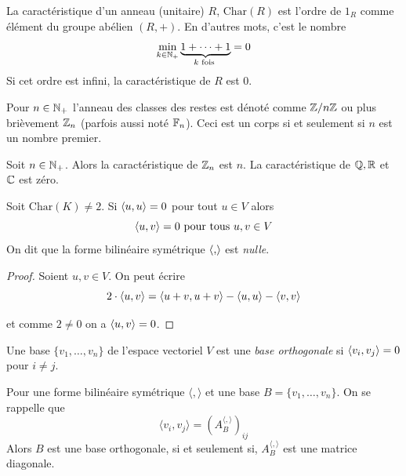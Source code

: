 \begin{definition}
  \label{def:8}
  La caractéristique d'un anneau (unitaire) $R$, $\mathrm{Char}(R)$ 
  est l'ordre de $1_R$
  comme élément du groupe abélien $(R,+)$.
  En d'autres mots, c'est le nombre 
  \begin{displaymath}
    \min_{k \in \mathbb{N}_+} \underbrace{1+ \cdots + 1}_{k \text{ fois }} = 0
  \end{displaymath}
  Si cet ordre est infini, la caractéristique de $R$ est $0$.
\end{definition}

\begin{notation}
  Pour $n \in \mathbb{N}_+$ l'anneau des classes des restes est dénoté comme
  $\mathbb{Z} / n \mathbb{Z}$ ou plus brièvement $\mathbb{Z}_n$ (parfois aussi noté $\Bbb F_n$). Ceci est un corps si et seulement si $n$ est un nombre premier. 
\end{notation}

\begin{example}
\label{exe:10}
   Soit $n \in \mathbb{N}_+$. Alors la  caractéristique de $\mathbb{Z}_n$ est $n$. 
   La caractéristique de $\mathbb{Q},\mathbb{R}$ et $\mathbb{C}$ est zéro.    
\end{example}

\begin{lemma}
  \label{lem:1}
 Soit $\mathrm{Char}(K)\neq 2$. Si $\langle {u,u} \rangle=0$ pour tout $u \in V$ alors 
  \begin{displaymath}
    \langle {u,v} \rangle=0 \text{ pour tous }u,v \in V
  \end{displaymath}
On dit que la forme bilinéaire symétrique $\langle {,} \rangle$ est  \emph{nulle}. 
\end{lemma}

\begin{proof}
  Soient $u,v \in V$. 
  On peut écrire
  \begin{displaymath}
   2 \cdot  \langle {u,v} \rangle = \langle {u+v,u+v} \rangle - \langle {u,u} \rangle - \langle {v,v} \rangle 
  \end{displaymath}

et comme $2 \neq 0$ on a $\langle {u,v} \rangle = 0$. 
\end{proof}


\begin{definition}
  \label{def:38}
  Une base $\{v_1,\dots,v_n\}$
  de l'espace vectoriel $V$
  est une \emph{base orthogonale} si $\langle {v_i,v_j} \rangle=0$
  pour $i\neq j$.
\end{definition}



\begin{remark}
  \label{rem:7}
  Pour une forme bilinéaire symétrique $\langle , \rangle$ et une base $B = \{v_1,\dots,v_n\}$. On se rappelle que 
  \begin{displaymath}
    〈v_i,v_j〉 = (A_B^{〈, 〉})_{ij}
  \end{displaymath}
  Alors $B$ est une base orthogonale, si et seulement si, $A_B^{\langle , \rangle}$ est une matrice diagonale.  
\end{remark}


